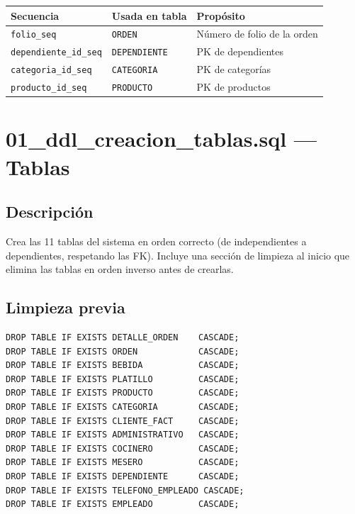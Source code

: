 \documentclass[12pt, a4paper]{article}
\begin{document}
\begin{center}
\begin{tabular}{lll}
    \toprule
    \textbf{Secuencia} & \textbf{Usada en tabla} & \textbf{Prop\'osito} \\
    \midrule
    \texttt{folio\_seq}          & \texttt{ORDEN}       & N\'umero de folio de la orden \\
    \texttt{dependiente\_id\_seq} & \texttt{DEPENDIENTE} & PK de dependientes \\
    \texttt{categoria\_id\_seq}  & \texttt{CATEGORIA}   & PK de categor\'ias \\
    \texttt{producto\_id\_seq}   & \texttt{PRODUCTO}    & PK de productos \\
    \bottomrule
\end{tabular}
\end{center}

\section{01\_ddl\_creacion\_tablas.sql --- Tablas}

\subsection{Descripci\'on}

Crea las 11 tablas del sistema en orden correcto (de independientes a dependientes, respetando las FK). Incluye una secci\'on de limpieza al inicio que elimina las tablas en orden inverso antes de crearlas.

\subsection{Limpieza previa}

\begin{lstlisting}[caption={DROP en orden inverso para respetar FKs}]
DROP TABLE IF EXISTS DETALLE_ORDEN    CASCADE;
DROP TABLE IF EXISTS ORDEN            CASCADE;
DROP TABLE IF EXISTS BEBIDA           CASCADE;
DROP TABLE IF EXISTS PLATILLO         CASCADE;
DROP TABLE IF EXISTS PRODUCTO         CASCADE;
DROP TABLE IF EXISTS CATEGORIA        CASCADE;
DROP TABLE IF EXISTS CLIENTE_FACT     CASCADE;
DROP TABLE IF EXISTS ADMINISTRATIVO   CASCADE;
DROP TABLE IF EXISTS COCINERO         CASCADE;
DROP TABLE IF EXISTS MESERO           CASCADE;
DROP TABLE IF EXISTS DEPENDIENTE      CASCADE;
DROP TABLE IF EXISTS TELEFONO_EMPLEADO CASCADE;
DROP TABLE IF EXISTS EMPLEADO         CASCADE;
\end{lstlisting}
\end{document}
